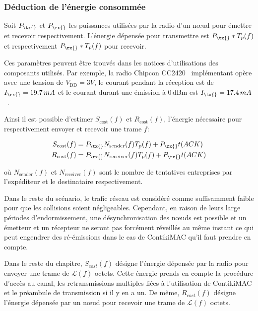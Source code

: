 \subsubsection{Déduction de l'énergie consommée}

Soit $P_{\tx{}}$ et $P_{\rx{}}$ les puissances utilisées par la radio d'un nœud pour émettre et recevoir respectivement.
L'énergie dépensée pour transmettre est $P_{\tx{}} * T_p(f)$ et respectivement $P_{\rx{}} * T_p(f)$ pour recevoir.

Ces paramètres peuvent être trouvés dans les notices d'utilisations des composants utilisés. 
Par exemple, la radio Chipcon CC2420~\cite{chipcon} implémentant \ieee{} opère avec une tension de $V_{\textrm{DD}} = 3V$, le courant pendant la réception est de $I_{\rx{}} = 19.7\,mA$ et le courant durant une émission à 0\,dBm est $I_{\tx{}} = 17.4\,mA$~\cite{cc2420datasheet}.

Ainsi il est possible d'estimer $S_{\textrm{cost}}(f)$ et $R_{\textrm{cost}}(f)$, l'énergie nécessaire pour respectivement envoyer et recevoir une trame $f$:

\begin{align}
  S_{\textrm{cost}}(f) &= P_{\tx{}}  N_{\textrm{sender}}(f)  T_p(f) +  P_{\rx{}}  t(ACK)\\
  R_{\textrm{cost}}(f) &= P_{\rx{}}  N_{\textrm{receiver}}(f)  T_p(f) + P_{\tx{}}  t(ACK)
\end{align}

où $N_{\textrm{sender}}(f)$ et $N_{\textrm{receiver}}(f)$ sont le nombre de tentatives entreprises par l'expéditeur et le destinataire respectivement. 

Dans le reste du scénario, le trafic réseau est considéré comme suffisamment faible pour que les collisions soient négligeables.
Cependant, en raison de leurs large périodes d'endormissement, une désynchronisation des nœuds est possible et un émetteur et un récepteur ne seront pas forcément réveillés au même instant ce qui peut engendrer des ré-émissions dans le cas de ContikiMAC qu'il faut prendre en compte.

Dans le reste du chapitre, $S_{cost}(f)$ désigne l'énergie dépensée par la radio pour envoyer une trame de $\mathcal{L}(f)$ octets.
Cette énergie prends en compte la procédure d'accès au canal, les retransmissions multiples liées à l'utilisation de ContikiMAC et le préambule de transmission si il y en a un.
De même, $R_{cost}(f)$ désigne l'énergie dépensée par un nœud pour recevoir une trame de $\mathcal{L}(f)$ octets.


